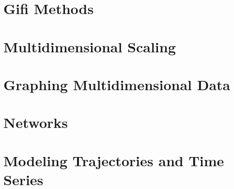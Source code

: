 \documentclass[
]{book}
\begin{document}
\hypertarget{gifi-methods}{%
\chapter{Gifi Methods}\label{gifi-methods}}

\hypertarget{multidimensional-scaling}{%
\chapter{Multidimensional Scaling}\label{multidimensional-scaling}}

\hypertarget{graphing-multidimensional-data}{%
\chapter{Graphing Multidimensional Data}\label{graphing-multidimensional-data}}

\hypertarget{networks}{%
\chapter{Networks}\label{networks}}

\hypertarget{modeling-trajectories-and-time-series}{%
\chapter{Modeling Trajectories and Time Series}\label{modeling-trajectories-and-time-series}}

  
\end{document}
